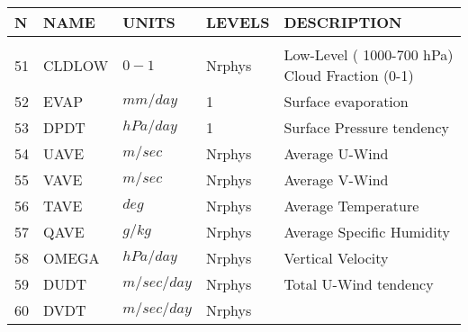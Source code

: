 \newpage
\vspace*{\fill}
\begin{tabular}{lllll}
\hline\hline
N & NAME & UNITS & LEVELS & DESCRIPTION \\
\hline

&\\
51 & CLDLOW   &    $0-1$   &  Nrphys 
         &\begin{minipage}[t]{3in}
          {Low-Level ( 1000-700 hPa) Cloud Fraction  (0-1)}
         \end{minipage}\\
52 & EVAP     &    $mm/day$   &  1 
         &\begin{minipage}[t]{3in}
          {Surface evaporation}
         \end{minipage}\\
53 & DPDT     &    $hPa/day$ &  1
         &\begin{minipage}[t]{3in}
          {Surface Pressure tendency}
         \end{minipage}\\
54 & UAVE     &    $m/sec$ &  Nrphys
         &\begin{minipage}[t]{3in}
          {Average U-Wind}
         \end{minipage}\\
55 & VAVE     &    $m/sec$ &  Nrphys
         &\begin{minipage}[t]{3in}
          {Average V-Wind}
         \end{minipage}\\
56 & TAVE     &    $deg$ &  Nrphys
         &\begin{minipage}[t]{3in}
          {Average Temperature}
         \end{minipage}\\
57 & QAVE     &    $g/kg$ &  Nrphys
         &\begin{minipage}[t]{3in}
          {Average Specific Humidity}
         \end{minipage}\\
58 & OMEGA    &    $hPa/day$ &  Nrphys
         &\begin{minipage}[t]{3in}
          {Vertical Velocity}
         \end{minipage}\\
59 & DUDT     &    $m/sec/day$ &  Nrphys
         &\begin{minipage}[t]{3in}
          {Total U-Wind tendency}
         \end{minipage}\\
60 & DVDT     &    $m/sec/day$ &  Nrphys

\end{tabular}

